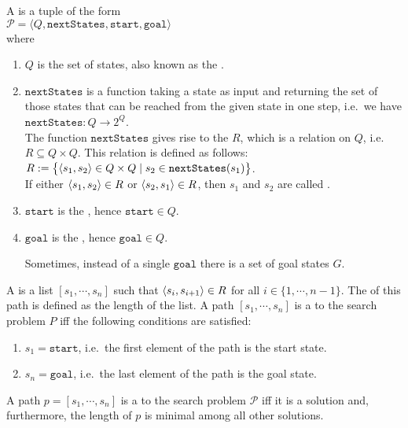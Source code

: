 \begin{Definition}
  A  is a tuple of the form
  \\[0.2cm]
  \hspace*{1.3cm}
  $\mathcal{P} = \langle Q,\mathtt{nextStates}, \mathtt{start}, \mathtt{goal}\rangle$
  \\[0.2cm]
  where
  \begin{enumerate}
  \item $Q$ is the set of states, also known as the .
  \item $\texttt{nextStates}$ is a function taking a state as input and returning the set of those
        states that can be reached from the given state in one step,
        i.e.~we have
        \\[0.2cm]
        \hspace*{1.3cm}
        $\texttt{nextStates}:Q \rightarrow 2^Q$.
        \\[0.2cm]
        The function $\mathtt{nextStates}$ gives rise to the  $R$, which is a
        relation on $Q$, i.e.~$R \subseteq Q \times Q$.  This relation is defined as follows:
        \\[0.2cm]
        \hspace*{1.3cm}
        $R := \bigl\{ \pair(s_1, s_2) \in Q \times Q \mid s_2 \in \mathtt{nextStates}(s_1) \bigr\}$.
        \\[0.2cm]
        If either $\pair(s_1, s_2) \in R$ or $\pair(s_2, s_1) \in R$, then  $s_1$ and $s_2$ are
        called .
  \item $\mathtt{start}$ is the , hence $\mathtt{start} \in Q$. 
  \item $\mathtt{goal}$ is the , hence $\mathtt{goal} \in Q$.

        Sometimes, instead of a single $\mathtt{goal}$ there is a set of goal states $G$.
  \end{enumerate}
  A  is a list $[s_1, \cdots, s_n]$ such that $\pair(s_i, s_{i+1}) \in R$ for all $i \in
  \{1,\cdots,n-1\}$. 
  The  of this path is defined as the length of the list. 
  A path $[s_1, \cdots, s_n]$ is a  to the search problem $P$ iff the following
  conditions are satisfied:
  \begin{enumerate}
  \item $s_1 = \mathtt{start}$, i.e.~the first element of the path is the start state.
  \item $s_n = \mathtt{goal}$, i.e.~the last element of the path is the goal state. 
  \end{enumerate}
  A path $p = [s_1, \cdots, s_n]$ is a  to the search problem $\mathcal{P}$ iff it is a
  solution and, furthermore, the length of $p$ is minimal among all other solutions. \eoxs
\end{Definition}


